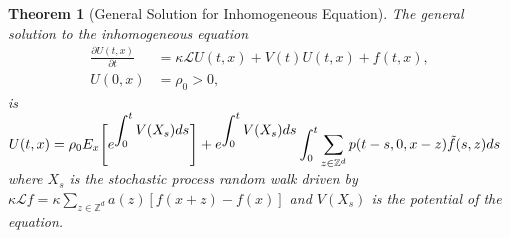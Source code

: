 \documentclass[sn-basic]{sn-jnl}%
\theoremstyle{thmstyleone}%
\newtheorem{theorem}{Theorem}%
\theoremstyle{thmstyletwo}%
\theoremstyle{thmstylethree}%
\numberwithin{equation}{theorem}
\begin{document}
\begin{theorem}[General Solution for Inhomogeneous Equation] \label{thm: general solution}
The general solution to the inhomogeneous equation
\begin{align}
\label{eq: differential general equation}
\displaystyle \frac{\partial U(t,x)}{\partial t} &= \kappa \mathcal{L} U(t,x) + V(t) U(t,x) + f(t,x),\\
U(0,x) &= \rho_{0} > 0,
\end{align}
is $U(t,x) = \rho_{0} E_{x}\Bigg[ e^{\displaystyle \int_{0}^{t} V(X_{s})ds}\Bigg]  + e^{\displaystyle \int_{0}^{t} V(X_{s})ds} \displaystyle \int_{0}^{t} \sum\limits_{z \in \mathbb{Z}^d} \mathnormal{p}(t-s,0,x-z) \tilde{f}(s,z) ds$ where $X_{s}$ is the stochastic process random walk driven by $\kappa \mathcal{L} f = \kappa \sum\limits_{z \in \mathbb{Z}^d} a(z) [f(x+z) -f(x)]$ and $V(X_{s})$ is the potential of the equation.
\end{theorem}
\end{document}

